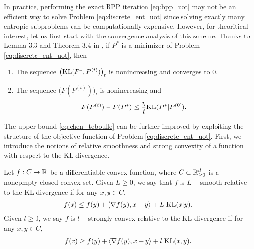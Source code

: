 In practice, performing the exact BPP iteration \eqref{eq:bpp_uot}
may not be an efficient way to solve Problem \eqref{eq:discrete_ent_uot} since
solving exactly many entropic subproblems can be computationally expensive,
However, for theoritical interest, let us first start with the convergence analysis of this scheme.
Thanks to Lemma 3.3 and Theorem 3.4 in \citep{Chen93}, if $P^*$ is a minimizer of
Problem \eqref{eq:discrete_ent_uot}, then
\begin{enumerate}
  \item The sequence $\big( \text{KL}(P^*, P^{(t)}) \big)_t$ is nonincreasing and converges to $0$.
  \item The sequence $\big( F(P^{(t)}) \big)_t$ is nonincreasing and
  \begin{align}
    \label{eq:chen_teboulle}
    F(P^{(t)}) - F(P^*) \leq \frac{\eta}{t} \text{KL}(P^* | P^{(0)}).
  \end{align}
\end{enumerate}
The upper bound \eqref{eq:chen_teboulle} can be further improved by exploiting the structure of
the objective function of Problem \eqref{eq:discrete_ent_uot}.
First, we introduce the notions of relative smoothness \citep{Bauschke17} and
strong convexity \citep{Lu18} of a function with respect to the KL divergence.
\begin{definition}
  \label{def:smooth-convex}
  Let $f:C \to \mathbb R$ be a differentiable convex function, where $C \subset \mathbb R^d_{\geq 0}$ is
  a nonepmpty closed convex set. Given $L \geq 0$, we say that $f$ is $L-$smooth relative to
  the KL divergence if for any $x, y \in C$,
  \begin{align}
    f(x) \leq f(y) + \langle \nabla f(y), x - y \rangle + L \; \text{KL}(x | y).
  \end{align}
  Given $l \geq 0$, we say $f$ is $l-$strongly convex relative to the KL divergence
  if for any $x, y \in C$,
  \begin{align}
    f(x) \geq f(y) + \langle \nabla f(y), x - y \rangle + l\; \text{KL}(x, y).
  \end{align}
\end{definition}
